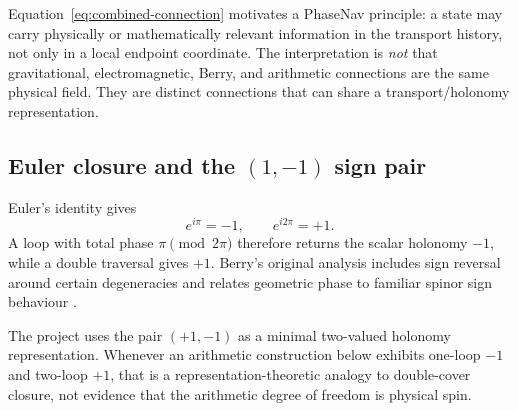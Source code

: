 \INTERP
Equation~\eqref{eq:combined-connection} motivates a PhaseNav principle: a state may carry physically or mathematically relevant information in the transport history, not only in a local endpoint coordinate. The interpretation is \emph{not} that gravitational, electromagnetic, Berry, and arithmetic connections are the same physical field. They are distinct connections that can share a transport/holonomy representation.

\subsection{Euler closure and the \((1,-1)\) sign pair}

Euler's identity gives
\begin{equation}
\boxed{e^{i\pi}=-1},\qquad e^{i2\pi}=+1.
\end{equation}
A loop with total phase \(\pi\pmod{2\pi}\) therefore returns the scalar holonomy \(-1\), while a double traversal gives \(+1\). Berry's original analysis includes sign reversal around certain degeneracies and relates geometric phase to familiar spinor sign behaviour \cite{Berry1984}.

\INTERP
The project uses the pair \((+1,-1)\) as a minimal two-valued holonomy representation. Whenever an arithmetic construction below exhibits one-loop \(-1\) and two-loop \(+1\), that is a representation-theoretic analogy to double-cover closure, not evidence that the arithmetic degree of freedom is physical spin.
